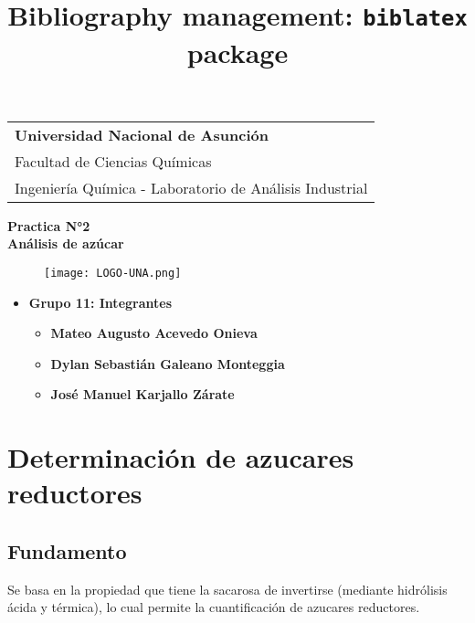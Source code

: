 \documentclass[a4paper,12pt]{article} %
\title{Bibliography management: \texttt{biblatex} package}
\begin{document}
\thispagestyle{empty} 
\begin{tabular}{p{15.5cm}}
{\large \bf Universidad Nacional de Asunción} \\
Facultad de Ciencias Químicas \\ 
Ingeniería Química - Laboratorio de Análisis Industrial \\
\hline
\end{tabular} 

\vspace*{0.3cm} %

\begin{center} 
    {\Large \bf Practica N°2  \\ \vspace{3mm} Análisis de azúcar}
    \vspace{5mm}
    \begin{figure}[H] 
	    \centering
        \texttt{[image: LOGO-UNA.png]}
    \end{figure}
\end{center}

\vspace{15mm}

\begin{itemize}
    \item \textbf{Grupo 11: Integrantes}
    \begin{itemize}
        \item{\bf Mateo Augusto Acevedo Onieva}
        \item{\bf Dylan Sebastián Galeano Monteggia}
        \item{\bf José Manuel Karjallo Zárate}
    \end{itemize}
\end{itemize}



\newpage

\section{Determinación de azucares reductores}

\subsection{Fundamento} 
Se basa en la propiedad que tiene la sacarosa de invertirse (mediante hidrólisis ácida y térmica), lo cual permite la cuantificación de azucares reductores.
\end{document}
